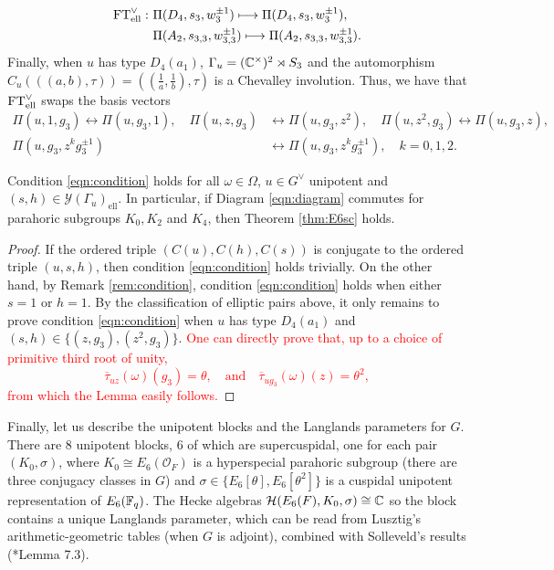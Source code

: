 \begin{align*}
    \FT^\vee_{\mathrm{ell}}:\ &\Pi(D_4,s_3,w_3^{\pm1})\longmapsto\Pi(D_4,s_3,w_3^{\pm1}),\\
    & \Pi(A_2,s_{3,3},w_{3,3}^{\pm1})\longmapsto\Pi(A_2,s_{3,3},w_{3,3}^{\pm1}).
\end{align*}
Finally, when $u$ has type $D_4(a_1)$, $\Gamma_u=(\mathbb{C}^\times)^2\rtimes S_3$ and the automorphism $C_u(((a,b),\tau))=((\frac{1}{a},\frac{1}{b}),\tau)$ is a Chevalley involution. Thus, we have that $\mathrm{FT}^\vee_{\mathrm{ell}}$ swaps the basis vectors
\begin{align*}
    \Pi(u,1,g_3)\longleftrightarrow\Pi(u,g_3,1),\quad \Pi(u,z,g_3)&\longleftrightarrow\Pi(u,g_3,z^2),\quad\Pi(u,z^2,g_3)\longleftrightarrow\Pi(u,g_3,z),\\
    \Pi(u,g_3,z^kg_3^{\pm1})&\longleftrightarrow\Pi(u,g_3,z^kg_3^{\pm1}),\quad k=0,1,2.
\end{align*}
\begin{lemma}
    Condition \eqref{eqn:condition} holds for all $\omega\in\Omega$, $u\in G^\vee$ unipotent and $(s,h)\in\mathcal{Y}(\Gamma_u)_{\mathrm{ell}}$. In particular, if Diagram \eqref{eqn:diagram} commutes for parahoric subgroups $K_0,K_2$ and $K_4$, then Theorem \ref{thm:E6sc} holds.
\end{lemma}
\begin{proof}
    If the ordered triple $(C(u),C(h),C(s))$ is conjugate to the ordered triple $(u,s,h)$, then condition \eqref{eqn:condition} holds trivially. On the other hand, by Remark \ref{rem:condition}, condition \eqref{eqn:condition} holds when either $s=1$ or $h=1$. By the classification of elliptic pairs above, it only remains to prove condition \eqref{eqn:condition} when $u$ has type $D_4(a_1)$ and $(s,h)\in\{(z,g_3),(z^2,g_3)\}$. \textcolor{red}{One can directly prove that, up to a choice of primitive third root of unity, $$\overline{\tau}_{uz}(\omega)(g_3)=\theta,\quad\text{and}\quad\overline{\tau}_{ug_3}(\omega)(z)=\theta^2,$$ from which the Lemma easily follows.}
\end{proof}

Finally, let us describe the unipotent blocks and the Langlands parameters for $G$. There are $8$ unipotent blocks, $6$ of which are supercuspidal, one for each pair $(K_0,\sigma)$, where $K_0\cong E_6(\mathcal{O}_F)$ is a hyperspecial parahoric subgroup (there are three conjugacy classes in $G$) and $\sigma\in\{E_6[\theta],E_6[\theta^2]\}$ is a cuspidal unipotent representation of $E_6(\mathbb{F}_q)$. The Hecke algebras $\mathcal{H}(E_6(F),K_0,\sigma)\cong\mathbb{C}$ so the block contains a unique Langlands parameter, which can be read from Lusztig's arithmetic-geometric tables (when $G$ is adjoint), combined with Solleveld's results (\cite{Solleveld2020}*{Lemma 7.3}).

